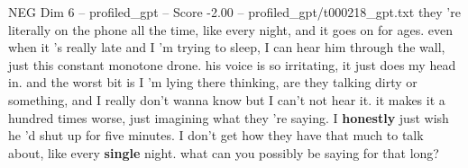 \begin{textsample}{NEG Dim 6 – profiled\_gpt – Score -2.00 – profiled\_gpt/t000218\_gpt.txt}  \label{ex:f6_neg_018}
they 're literally on the phone all the time, like every night, and it goes on for ages. even when it 's really late and I 'm trying to sleep, I can hear him through the wall, just this constant monotone drone. his voice is so irritating, it just does my head in. and the worst bit is I 'm lying there thinking, are they talking dirty or something, and I really don't wanna know but I can't not hear it. it makes it a hundred times worse, just imagining what they 're saying.
I \textbf{honestly} just wish he 'd shut up for five minutes.
I don't get how they have that much to talk about, like every \textbf{single} night. what can you possibly be saying for that long?

\end{textsample}
